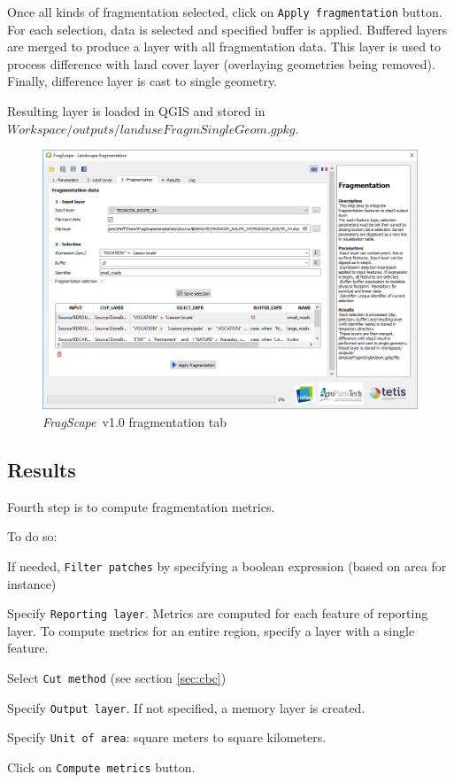 \documentclass[11pt]{article}
\newcommand{\source}[1]{\vspace*{-0.4cm}\caption*{\textit{Source: {#1}}}}
\newcommand{\tool}{\emph{FragScape}}
\let\tempone\itemize
\let\temptwo\enditemize
\renewenvironment{itemize}{\tempone\addtolength{\itemsep}{-0.5\baselineskip}}{\temptwo}
\begin{document}
Once all kinds of fragmentation selected, click on \texttt{Apply fragmentation} button. For each selection, data is selected and specified buffer is applied. Buffered layers are merged to produce a layer with all fragmentation data. This layer is used to process difference with land cover layer (overlaying geometries being removed). Finally, difference layer is cast to single geometry.

Resulting layer is loaded in QGIS and stored in $Workspace/outputs/landuseFragmSingleGeom.gpkg$.

\begin{figure}[h!]
    \centering
    \includegraphics[scale=0.7]{pictures/fragmTabEn.png}
    \caption{\tool\ v1.0 fragmentation tab}
    \label{fig:fragmTab}
\end{figure}

\subsection{Results}

Fourth step is to compute fragmentation metrics.

To do so:
\begin{itemize}
    \item If needed, \texttt{Filter patches} by specifying a boolean expression (based on area for instance)
    \item Specify \texttt{Reporting layer}. Metrics are computed for each feature of reporting layer. To compute metrics for an entire region, specify a layer with a single feature.
    \item Select \texttt{Cut method} (see section \ref{sec:cbc})
    \item Specify \texttt{Output layer}. If not specified, a memory layer is created.
    \item Specify \texttt{Unit of area}: square meters to square kilometers.
    \item Click on \texttt{Compute metrics} button.
\end{itemize}
\end{document}
